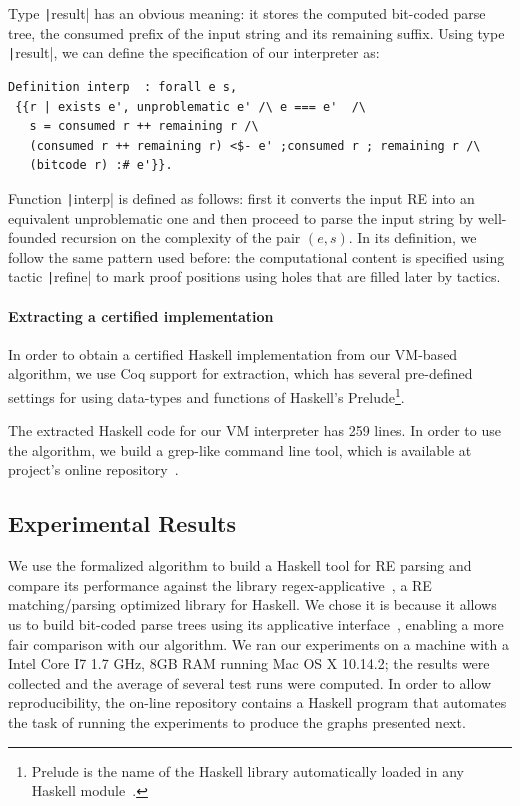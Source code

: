 \documentclass[oneside,12pt]{scrbook}
\theoremstyle{definition}
\newcommand{\coq}[1]{\texttt|#1|}
\theoremstyle{plain}
\theoremstyle{definition}
\begin{document}
Type \coq{result} has an obvious meaning: it stores the computed bit-coded parse
tree, the consumed prefix of the input string and its remaining suffix. Using
type \coq{result}, we can define the specification of our interpreter as:

\begin{verbatim}
Definition interp  : forall e s,
 {{r | exists e', unproblematic e' /\ e === e'  /\
   s = consumed r ++ remaining r /\
   (consumed r ++ remaining r) <$- e' ;consumed r ; remaining r /\
   (bitcode r) :# e'}}. 
\end{verbatim}
Function \coq{interp} is defined as follows: first it converts the input RE into
an equivalent unproblematic one and then proceed to parse the input string by
well-founded recursion on the complexity of the pair $(e,s)$. In its definition,
we follow the same pattern used before: the computational content is specified
using tactic \coq{refine} to mark proof positions using holes that are filled
later by tactics.

\paragraph{Extracting a certified implementation}

In order to obtain a certified Haskell implementation from our VM-based algorithm,
we use Coq support for extraction, which has several pre-defined
settings for using data-types and functions of Haskell's
Prelude\footnote{Prelude is the name of the Haskell library automatically loaded
in any Haskell module~\cite{Haskell98}.}.

The extracted Haskell code for our VM interpreter has 259 lines. In order to use 
the algorithm, we build a grep-like command line tool, which is available at 
project's online repository~\cite{regexvm-rep}. 

\subsection{Experimental Results}\label{subsection:bigstepexperiments}

We use the formalized algorithm to build a Haskell tool for RE parsing and
compare its performance against the library
regex-applicative~\cite{regex-applicative},  a RE
matching/parsing optimized library for Haskell. We chose it is because it allows us to 
build bit-coded parse trees using its applicative interface~\cite{Mcbride2008},
enabling a more fair comparison with our algorithm.
We ran our experiments on a machine with a Intel Core I7 1.7 GHz, 8GB RAM 
running Mac OS X 10.14.2; the results were collected and the average of several 
test runs were computed. In order to allow reproducibility, the on-line
repository contains a Haskell program that automates the task of running the 
experiments to produce the graphs presented next.
\end{document}
